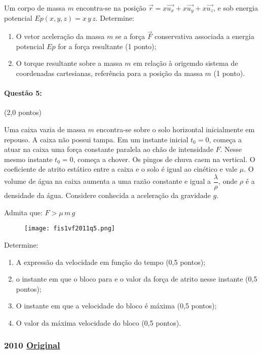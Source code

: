 \documentclass[12pt,a4paper]{article}
\newcommand{\original}[1]{\tiny \href{#1}{Original} \normalsize}
\begin{document}
Um corpo de massa $m$ encontra-se na posição $\vec{r}=x\vec{u_x}+x\vec{u_y}+x\vec{u_z}$, e sob energia potencial $Ep(x,y,z)=x\,y\,z$. Determine:

\begin{enumerate}[label=(\alph*)]
\item O vetor aceleração da massa $m$ se a força $\vec F$ conservativa associada a energia potencial $Ep$ for a força resultante (1 ponto);
\item O torque resultante sobre a massa $m$ em relação à origemdo sistema de coordenadas cartesianas, referência para a posição da massa $m$ (1 ponto).
\end{enumerate}

\paragraph{Questão 5:} (2,0 pontos)

Uma caixa vazia de massa $m$ encontra-se sobre o solo horizontal inicialmente em repouso. A caixa não possui tampa. Em um instante inicial $t_0=0$, começa a atuar na caixa uma força constante paralela ao chão de intensidade $F$. Nesse mesmo instante $t_0=0$, começa a chover. Os pingos de chuva caem na vertical. O coeficiente de atrito estático entre a caixa e o solo é igual ao cinético e vale $\mu$. O volume de água na caixa aumenta a uma razão constante e igual a $\dfrac{\lambda}{\rho}$, onde $\rho$ é a densidade da água. Considere conhecida a aceleração da gravidade $g$.

Admita que: $F>\mu \,m\,g$

\begin{figure}[ht]
\centering
\texttt{[image: fis1vf2011q5.png]}
\end{figure}

Determine:
\begin{enumerate}[label=(\alph*)]
\item A expressão da velocidade em função do tempo (0,5 pontos);
\item o instante em que o bloco para e o valor da força de atrito nesse instante (0,5 pontos);
\item O instante em que a velocidade do bloco é máxima (0,5 pontos);
\item O valor da máxima velocidade do bloco (0,5 pontos).
\end{enumerate}

\newpage

\subsubsection{2010 \original{https://drive.google.com/file/d/1mAu-s7dG1emF7mEX3oMb9BTTRj0xdvb0/view?usp=sharing}}
\end{document}

